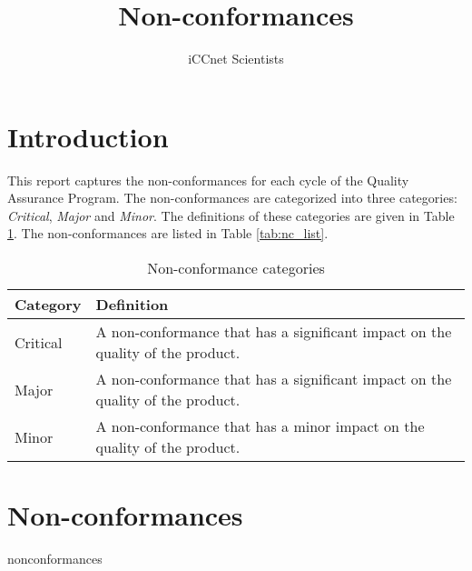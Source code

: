\usepackage{amsmath}
\usepackage{amssymb}
\usepackage{graphicx}

\usepackage{color}
\usepackage{hyperref}
\usepackage{url}
\usepackage{cite}
\usepackage{subfigure}

\author{iCCnet Scientists}

\title{Non-conformances}



\maketitle

\section{Introduction}
This report captures the non-conformances for each cycle of the Quality Assurance Program.
The non-conformances are categorized into three categories: \textit{Critical}, \textit{Major} and \textit{Minor}. The definitions of these categories are given in Table \ref{tab:nc_categories}. The non-conformances are listed in Table \ref{tab:nc_list}.

\begin{table}[htbp]
\centering
\caption{Non-conformance categories}
\label{tab:nc_categories}
\begin{tabular}{|l|l|}
\hline
\textbf{Category} & \textbf{Definition} \\ \hline
Critical & A non-conformance that has a significant impact on the quality of the product. \\ \hline
Major & A non-conformance that has a significant impact on the quality of the product. \\ \hline
Minor & A non-conformance that has a minor impact on the quality of the product. \\ \hline
\end{tabular}
\end{table}


\section{Non-conformances}

{{nonconformances}}


